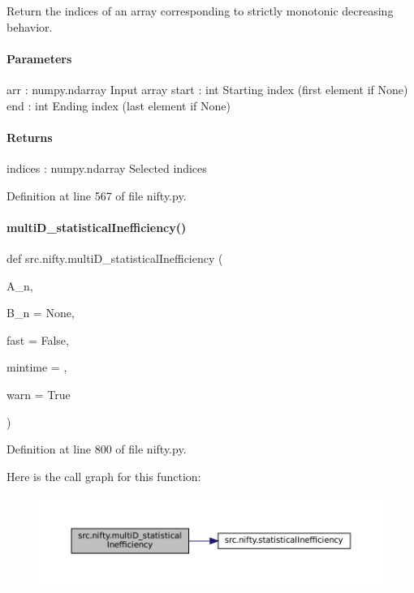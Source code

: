 Return the indices of an array corresponding to strictly monotonic decreasing behavior. 

\paragraph*{Parameters }

arr \+: numpy.\+ndarray Input array start \+: int Starting index (first element if None) end \+: int Ending index (last element if None)

\paragraph*{Returns }

indices \+: numpy.\+ndarray Selected indices 

Definition at line 567 of file nifty.\+py.

\mbox{\label{namespacesrc_1_1nifty_ae6a4c098b47b62b0d94ca8015134597f}} 
\paragraph{\texorpdfstring{multi\+D\+\_\+statistical\+Inefficiency()}{multiD\_statisticalInefficiency()}}
{\footnotesize\ttfamily def src.\+nifty.\+multi\+D\+\_\+statistical\+Inefficiency (\begin{DoxyParamCaption}\item[{}]{A\+\_\+n,  }\item[{}]{B\+\_\+n = {\ttfamily None},  }\item[{}]{fast = {\ttfamily False},  }\item[{}]{mintime = {},  }\item[{}]{warn = {\ttfamily True} }\end{DoxyParamCaption})}



Definition at line 800 of file nifty.\+py.

Here is the call graph for this function\+:
\nopagebreak
\begin{figure}[H]
\begin{center}
\leavevmode
\includegraphics[width=350pt]{namespacesrc_1_1nifty_ae6a4c098b47b62b0d94ca8015134597f_cgraph}
\end{center}
\end{figure}
\mbox{\label{namespacesrc_1_1nifty_afbfdd73ff77aab6dc75bc793494d069f}} 
